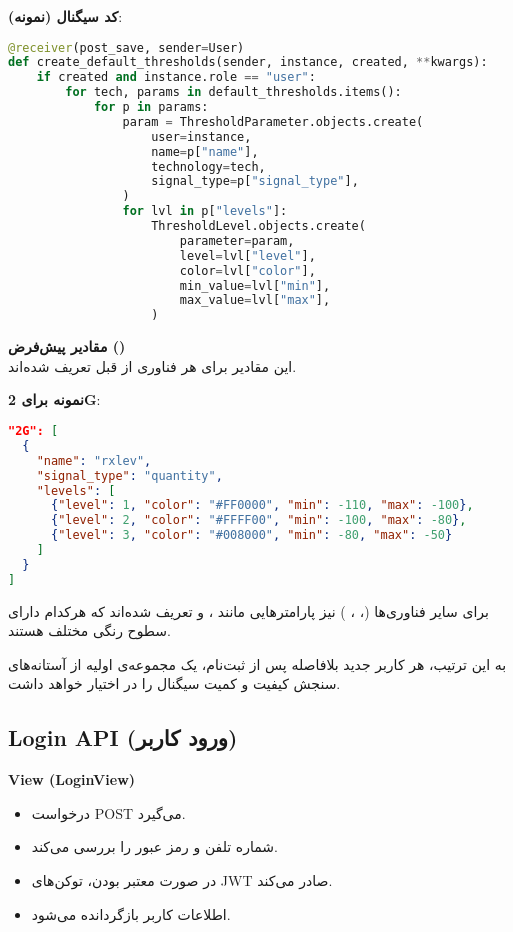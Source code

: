 \documentclass{report}
\begin{document}
\textbf{کد سیگنال (نمونه)}:
\begin{lstlisting}[language=python]
@receiver(post_save, sender=User)
def create_default_thresholds(sender, instance, created, **kwargs):
    if created and instance.role == "user":
        for tech, params in default_thresholds.items():
            for p in params:
                param = ThresholdParameter.objects.create(
                    user=instance,
                    name=p["name"],
                    technology=tech,
                    signal_type=p["signal_type"],
                )
                for lvl in p["levels"]:
                    ThresholdLevel.objects.create(
                        parameter=param,
                        level=lvl["level"],
                        color=lvl["color"],
                        min_value=lvl["min"],
                        max_value=lvl["max"],
                    )
\end{lstlisting}

\textbf{مقادیر پیش‌فرض ()} \\
این مقادیر برای هر فناوری از قبل تعریف شده‌اند.

\textbf{نمونه برای 2G}:
\begin{lstlisting}[language=json]
"2G": [
  {
    "name": "rxlev",
    "signal_type": "quantity",
    "levels": [
      {"level": 1, "color": "#FF0000", "min": -110, "max": -100},
      {"level": 2, "color": "#FFFF00", "min": -100, "max": -80},
      {"level": 3, "color": "#008000", "min": -80, "max": -50}
    ]
  }
]
\end{lstlisting}

برای سایر فناوری‌ها (، ، ) نیز پارامترهایی مانند ،  و  تعریف شده‌اند که هرکدام دارای سطوح رنگی مختلف هستند. 

به این ترتیب، هر کاربر جدید بلافاصله پس از ثبت‌نام، یک مجموعه‌ی اولیه از آستانه‌های سنجش کیفیت و کمیت سیگنال را در اختیار خواهد داشت.



\subsection{Login API (ورود کاربر)}
\textbf{View (LoginView)} \\
\begin{itemize}
  \item درخواست POST می‌گیرد.
  \item شماره تلفن و رمز عبور را بررسی می‌کند.
  \item در صورت معتبر بودن، توکن‌های JWT صادر می‌کند.
  \item اطلاعات کاربر بازگردانده می‌شود.
\end{itemize}
\end{document}

